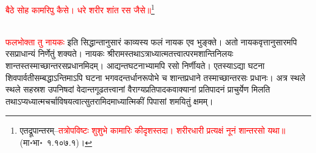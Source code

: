 \centering\textcolor{red}{बैठे सोह कामरिपु कैसे। धरे शरीर शांत रस जैसे॥}\footnote{एतद्रूपान्तरम्–\textcolor{red}{तत्रोपविष्टः शुशुभे कामारिः कीदृशस्तदा। शरीरधारी प्रत्यक्षं नूनं शान्तरसो यथा॥} (मा॰भा॰~१.१०७.१)।}\nopagebreak\\
\\
\begin{sloppypar}\justifying\noindent \textcolor{red}{फल\-भोक्ता तु नायकः} इति सिद्धान्तानुसारं काव्यस्य फलं नायक एव भुङ्क्ते। अतो नायक\-वृत्तानु\-सारमपि रस\-प्राधान्यं निर्णेतुं शक्यते। नायकः श्रीरामस्तथाऽत्राध्यात्म\-तत्त्वात्परम\-शान्ति\-निलयः शान्तस्तस्माच्छान्त\-रस\-प्रधानमिदम्। आद्यन्तघटनाभ्यामपि रसो निर्णीयते। एतस्याऽद्या घटना शिव\-पार्वती\-सम्बद्धाऽन्तिमाऽपि घटना भगवदन्तर्धानरूपोभे च शान्त\-प्रधाने तस्माच्छान्त\-रसः प्रधानः। अत्र स्थले स्थले सहस्रश उपनिषदां वेदान्त\-गूढ\-तत्त्वानां वैराग्य\-प्रतिपादक\-वाक्यानां प्रतिपादनं प्राचुर्येण मिलति तथाऽप्यध्यात्म\-चर्चा\-विषयत्वात्सुतरामिदमाध्यात्मिकीं पिपासां शमयितुं क्षमम्।\end{sloppypar}
